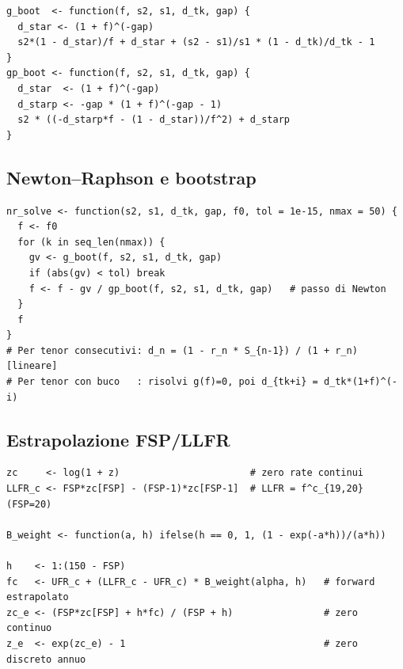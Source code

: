 \documentclass[11pt,a4paper]{article}
\theoremstyle{plain}
\theoremstyle{definition}
\theoremstyle{remark}
\begin{document}
\begin{codebox}
\begin{Verbatim}[fontsize=\small]
g_boot  <- function(f, s2, s1, d_tk, gap) {
  d_star <- (1 + f)^(-gap)
  s2*(1 - d_star)/f + d_star + (s2 - s1)/s1 * (1 - d_tk)/d_tk - 1
}
gp_boot <- function(f, s2, s1, d_tk, gap) {
  d_star  <- (1 + f)^(-gap)
  d_starp <- -gap * (1 + f)^(-gap - 1)
  s2 * ((-d_starp*f - (1 - d_star))/f^2) + d_starp
}
\end{Verbatim}
\end{codebox}

\subsection{Newton--Raphson e bootstrap}

\begin{codebox}
\begin{Verbatim}[fontsize=\small]
nr_solve <- function(s2, s1, d_tk, gap, f0, tol = 1e-15, nmax = 50) {
  f <- f0
  for (k in seq_len(nmax)) {
    gv <- g_boot(f, s2, s1, d_tk, gap)
    if (abs(gv) < tol) break
    f <- f - gv / gp_boot(f, s2, s1, d_tk, gap)   # passo di Newton
  }
  f
}
# Per tenor consecutivi: d_n = (1 - r_n * S_{n-1}) / (1 + r_n)      [lineare]
# Per tenor con buco   : risolvi g(f)=0, poi d_{tk+i} = d_tk*(1+f)^(-i)
\end{Verbatim}
\end{codebox}

\subsection{Estrapolazione FSP/LLFR}

\begin{codebox}
\begin{Verbatim}[fontsize=\small]
zc     <- log(1 + z)                       # zero rate continui
LLFR_c <- FSP*zc[FSP] - (FSP-1)*zc[FSP-1]  # LLFR = f^c_{19,20}  (FSP=20)

B_weight <- function(a, h) ifelse(h == 0, 1, (1 - exp(-a*h))/(a*h))

h    <- 1:(150 - FSP)
fc   <- UFR_c + (LLFR_c - UFR_c) * B_weight(alpha, h)   # forward estrapolato
zc_e <- (FSP*zc[FSP] + h*fc) / (FSP + h)                # zero continuo
z_e  <- exp(zc_e) - 1                                   # zero discreto annuo
\end{Verbatim}
\end{codebox}
\end{document}
